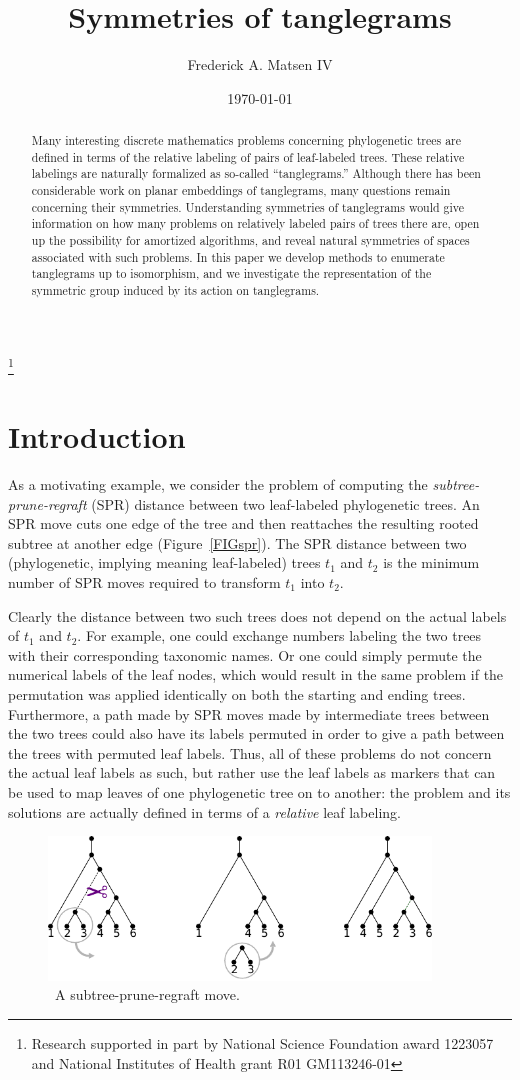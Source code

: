 \documentclass{amsart}
\newcommand{\arxiv}[1]{#1}
\newcommand{\FIGspr}{\
\label{FIGspr}
\begin{figure}
  \arxiv{\includegraphics[width=4in]{figures/spr-definition}}
\caption{\
  A subtree-prune-regraft move.
}
\end{figure}
}
\begin{document}
\title{Symmetries of tanglegrams}
\author[Matsen]{Frederick A. Matsen IV}
\address{Fred Hutchinson Cancer Research Center \\ Seattle, WA}
\thanks{Research supported in part by National Science Foundation award 1223057 and National Institutes of Health grant R01 GM113246-01}


\date{\today}

\begin{abstract}
Many interesting discrete mathematics problems concerning phylogenetic trees are defined in terms of the relative labeling of pairs of leaf-labeled trees.
These relative labelings are naturally formalized as so-called ``tanglegrams.''
Although there has been considerable work on planar embeddings of tanglegrams, many questions remain concerning their symmetries.
Understanding symmetries of tanglegrams would give information on how many problems on relatively labeled pairs of trees there are, open up the possibility for amortized algorithms, and reveal natural symmetries of spaces associated with such problems.
In this paper we develop methods to enumerate tanglegrams up to isomorphism, and we investigate the representation of the symmetric group induced by its action on tanglegrams.
\end{abstract}

\maketitle


\section{Introduction}
As a motivating example, we consider the problem of computing the \emph{subtree-prune-regraft} (SPR) distance between two leaf-labeled phylogenetic trees.
An SPR move cuts one edge of the tree and then reattaches the resulting rooted subtree at another edge (Figure~\ref{FIGspr}).
The SPR distance between two (phylogenetic, implying meaning leaf-labeled) trees $t_1$ and $t_2$ is the minimum number of SPR moves required to transform $t_1$ into $t_2$.

Clearly the distance between two such trees does not depend on the actual labels of $t_1$ and $t_2$.
For example, one could exchange numbers labeling the two trees with their corresponding taxonomic names.
Or one could simply permute the numerical labels of the leaf nodes, which would result in the same problem if the permutation was applied identically on both the starting and ending trees.
Furthermore, a path made by SPR moves made by intermediate trees between the two trees could also have its labels permuted in order to give a path between the trees with permuted leaf labels.
Thus, all of these problems do not concern the actual leaf labels as such, but rather use the leaf labels as markers that can be used to map leaves of one phylogenetic tree on to another: the problem and its solutions are actually defined in terms of a \emph{relative} leaf labeling.
\FIGspr
\end{document}
